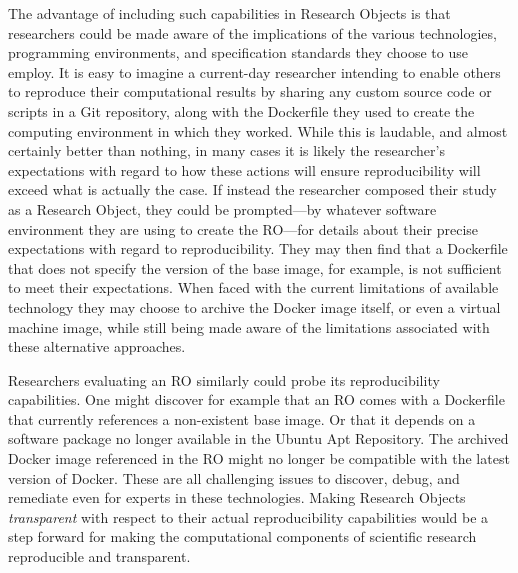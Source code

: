 The advantage of including such capabilities in Research Objects is that researchers could be made aware
	of the implications of the various technologies, programming environments, and specification
	standards they choose to use employ.
It is easy to imagine a current-day researcher intending to enable others to reproduce their computational
	results by sharing any custom source code or scripts in a Git repository, along with the Dockerfile
	they used to create the computing environment in which they worked.
While this is laudable, and almost certainly better than nothing, in many cases it is likely the researcher's
	expectations with regard to how these actions will ensure reproducibility will exceed
	what is actually the case.
If instead the researcher composed their study as a Research Object, they could be prompted---by whatever
	software environment they are using to create the RO---for details about their precise expectations with
	regard to reproducibility.
They may then find that a Dockerfile that does not specify the version of the base image, for example, is not sufficient
	to meet their expectations.
When faced with the current limitations of available technology they may choose to archive the Docker image itself,
	or even a virtual machine image, while still being made aware of the limitations associated with these alternative
	approaches.

Researchers evaluating an RO similarly could probe its reproducibility capabilities.  One might discover for example
	that an RO comes with a Dockerfile that currently references a non-existent base image.
Or that it depends on a software package no longer available in the Ubuntu Apt Repository.
The archived Docker image referenced in the RO might no longer be compatible with the latest version of Docker.
These are all challenging issues to discover, debug, and remediate even for experts in these technologies.
Making Research Objects \emph{transparent} with respect to their actual reproducibility capabilities would be a
	step forward for making the computational components of scientific research reproducible and
	transparent.
